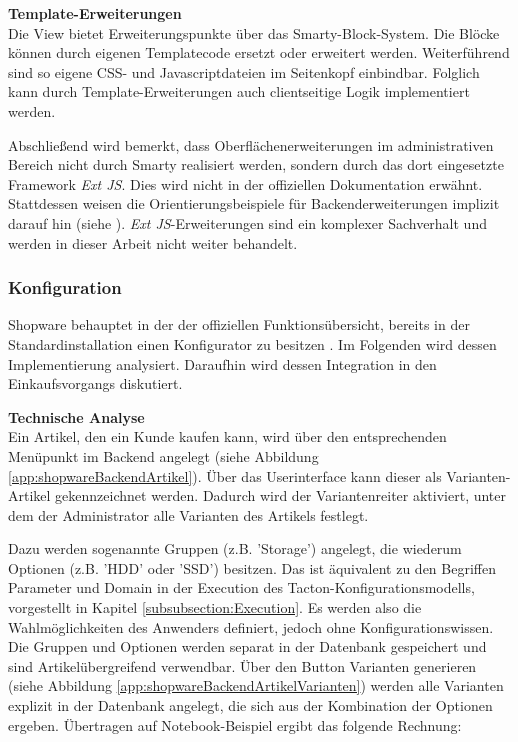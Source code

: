 \documentclass[11pt, a4paper, titlepage, listof=totoc, bibliography=totoc, index=totoc, twoside, openright, headings=normal]{scrreprt}
\begin{document}
\textbf{Template-Erweiterungen}\\
Die View bietet Erweiterungspunkte über das Smarty-Block-System. Die Blöcke können durch eigenen Templatecode ersetzt oder erweitert werden. Weiterführend sind so eigene CSS- und Javascriptdateien im Seitenkopf einbindbar. Folglich kann durch Template-Erweiterungen auch clientseitige Logik implementiert werden.

Abschließend wird bemerkt, dass Oberflächenerweiterungen im administrativen Bereich nicht durch Smarty realisiert werden, sondern durch das dort eingesetzte Framework \emph{Ext JS}. Dies wird nicht in der offiziellen Dokumentation erwähnt. Stattdessen weisen die Orientierungsbeispiele für Backenderweiterungen implizit darauf hin (siehe \citet{shopwareBackendPluginExamples}). \emph{Ext JS}-Erweiterungen sind ein komplexer Sachverhalt und werden in dieser Arbeit nicht weiter behandelt.

\subsubsection{Konfiguration}
\label{subsubsection:shopwareKonfiguration}
Shopware behauptet in der der offiziellen Funktionsübersicht, bereits in der Standardinstallation einen Konfigurator zu besitzen \citep{shopware5Funktionsuebersicht}. Im Folgenden wird dessen Implementierung analysiert. Daraufhin wird dessen Integration in den Einkaufsvorgangs diskutiert.

\textbf{Technische Analyse}\\
Ein Artikel, den ein Kunde kaufen kann, wird über den entsprechenden Menüpunkt im Backend angelegt (siehe Abbildung \ref{app:shopwareBackendArtikel}). Über das Userinterface kann dieser als \glqq Varianten-Artikel\grqq{} gekennzeichnet werden. Dadurch wird der Variantenreiter aktiviert, unter dem der Administrator alle Varianten des Artikels festlegt.

Dazu werden sogenannte \glqq Gruppen\grqq{} (z.B. 'Storage') angelegt, die wiederum \glqq Optionen\grqq{} (z.B. 'HDD' oder 'SSD') besitzen. Das ist äquivalent zu den Begriffen \glqq Parameter\grqq{} und \glqq Domain\grqq{} in der Execution des Tacton-Konfigurationsmodells, vorgestellt in Kapitel \ref{subsubsection:Execution}. Es werden also die Wahlmöglichkeiten des Anwenders definiert, jedoch ohne Konfigurationswissen. Die Gruppen und Optionen werden separat in der Datenbank gespeichert und sind Artikelübergreifend verwendbar. Über den Button \glqq Varianten generieren\grqq{} (siehe Abbildung \ref{app:shopwareBackendArtikelVarianten}) werden alle Varianten explizit in der Datenbank angelegt, die sich aus der Kombination der Optionen ergeben. Übertragen auf Notebook-Beispiel ergibt das folgende Rechnung:
\end{document}
